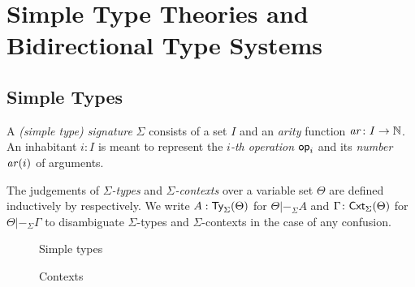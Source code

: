 
\section{Simple Type Theories and Bidirectional Type Systems}\label{sec:defs}

\subsection{Simple Types}
\begin{definition}
  A \emph{(simple type) signature} $\Sigma$ consists of a set $I$ and an \emph{arity} function $\mathit{ar}\colon I \to \mathbb{N}$.
  An inhabitant $i : I$ is meant to represent the \emph{$i$-th operation} $\mathsf{op}_i$ and its \emph{number} $ \mathit{ar}(i)$ of arguments.

  The judgements of \emph{$\Sigma$-types} and \emph{$\Sigma$-contexts} over a variable set $\Theta$ are defined inductively by  respectively.
We write $A : \mathsf{Ty}_{\Sigma}(\Theta)$ for $\Theta |-_{\Sigma} A$ and $\Gamma \colon \mathsf{Cxt}_{\Sigma}(\Theta)$ for $\Theta |-_{\Sigma} \Gamma$ to disambiguate $\Sigma$-types and $\Sigma$-contexts in the case of any confusion.
\end{definition}

\begin{figure}
  \begin{minipage}[b]{.6\textwidth}
    \centering
    \small
    \caption{Simple types}
    \label{fig:simple-type}
  \end{minipage}
  \begin{minipage}[b]{.35\textwidth}
    \centering
    \small
    \judgbox{\Theta |-_{\Sigma} \Gamma}{}
    \caption{Contexts}
  \label{fig:simple-context}
  \end{minipage}
\end{figure}

